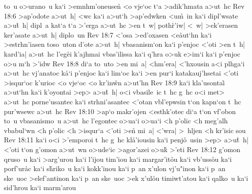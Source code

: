 to~u
o>urano~u
ka`i
>emnhm'oneuse\r{n}
<o
vje`oc
t`a
>adik'hmata
a>ut~hc\bibvsend
\vs Rev 18:6
>ap'odote
a>ut~h|
<wc
ka`i
a>ut`h
>ap'edwken
<u\r{m}~in
ka`i
dipl'wsate
a>u\r{t}~h|
dipl~a
kat`a
t`a
>'erga
a>ut~hc
>en
t~w|
poth\r{r}'iw|
<~w|
>ek'erasen
ker'asate
a>ut~h|
diplo~un\bibvsend
\vs Rev 18:7
<'osa
>ed'oxasen
<e\r{a}ut`hn
ka`i
>estrhn'iasen
toso~uton
d'ote
a>ut~h|
vbasanism`on
ka`i
p'enjoc
<'oti
>en
t~h|
kard'ia|
a>ut~hc
l'eg\r{e}i
k'ajhmai
vbas'ilissa
ka`i
q'hra
o>uk
e>im`i
ka`i
p'enjoc
o>u
m`h
>'idw\bibvsend
\vs Rev 18:8
di`a
to~uto
>en
mi~a|
<hm'era|
<'hxousin
a<i
plhga`i
a>ut~hc
vj'anatoc
k\r{a}`i
p'enjoc
ka`i
lim`oc
ka`i
>en
pur`i
katakauj'hsetai
<'oti
>isqur`oc
k'urioc
<o
vje`oc
<o
kr'in\r{w}n
a>ut'hn\bibvsend
\vs Rev 18:9
ka`i
kla'usontai\r{}
a>ut`hn
ka`i
k'oyontai
>ep>
a>u\r{t}~h|
o<i
vbasile~ic
t~hc
g~hc
o<i
met>
a>ut~hc
porne'usantec
ka`i
strhni'asantec
<'otan
vbl'epwsin
t`on
kapn`on
t~hc
pur'wsewc
a>ut~hc\bibvsend
\vs Rev 18:10
>ap`o
makr'ojen
<esthk'otec
di`a
t`on
vf'obon
to~u
vbasanismo~u
a>ut~hc
l'egontec
o>ua`i
o>ua`i
<h
p'olic
<h
meg'alh
vbabul`wn
<h
p'olic
<h
>isqur`a
<'oti
>e\r{n}
mi~a|
<'wra|
>~hljen
<h
kr'isic
sou\bibvsend
\vs Rev 18:11
ka`i
o<i
>'emporoi
t~hc
g~hc
kl\r{a}'iousin
ka`i
penj\r{o}~usin
>ep>
a>u\r{t}~h|
<'oti
t`on
g'omon
a>ut~wn
o>ude`ic
>agor'azei
o>uk\r{}
>'eti\bibvsend
\vs Rev 18:12
g'omon
qruso~u
ka`i
>arg'urou
ka`i
l'ijou
tim'iou
ka`i
margar'it\r{o}u
ka`i
vb'uss\r{o}u
ka`i
porf'ur\r{a}c
ka`i
s\r{h}riko~u
ka`i
kokk'inou
ka`i
p~an
x'ulon
vj'u"inon
ka`i
p~an
ske~uoc
>elef'antinon
ka`i
p~an
ske~uoc
>ek
x'ul\r{o}u
timiwt'atou
ka`i
qalko~u
ka`i
sid'hrou
ka`i
marm'arou\bibvsend
